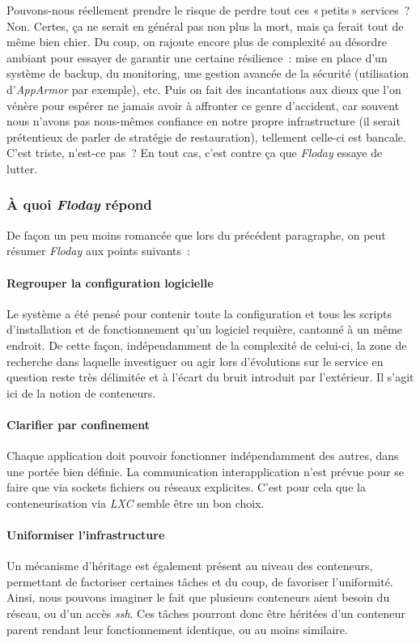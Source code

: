 Pouvons-nous réellement prendre le risque de perdre tout ces «\,petits\,» services~?
Non. Certes, ça ne serait en général pas non plus la mort, mais ça ferait tout de même bien chier.
Du coup, on rajoute encore plus de complexité au désordre ambiant pour essayer de garantir une certaine résilience~: mise en place d'un système de backup, du monitoring, une gestion avancée de la sécurité (utilisation d'\emph{AppArmor} par exemple), etc.
Puis on fait des incantations aux dieux que l'on vénère pour espérer ne jamais avoir à affronter ce genre d'accident, car souvent nous n'avons pas nous-mêmes confiance en notre propre infrastructure (il serait prétentieux de parler de stratégie de restauration), tellement celle-ci est bancale.
C'est triste, n'est-ce pas~? En tout cas, c'est contre ça que \emph{Floday} essaye de lutter.

\subsubsection{À quoi \emph{Floday} répond}
De façon un peu moins romancée que lors du précédent paragraphe, on peut résumer \emph{Floday} aux points suivants~:

\paragraph{Regrouper la configuration logicielle}
Le système a été pensé pour contenir toute la configuration et tous les scripts d'installation et de fonctionnement qu'un logiciel requière, cantonné à un même endroit.
De cette façon, indépendamment de la complexité de celui-ci, la zone de recherche dans laquelle investiguer ou agir lors d'évolutions sur le service en question reste très délimitée et à l'écart du bruit introduit par l'extérieur.
Il s'agit ici de la notion de \glspl{conteneur}.

\paragraph{Clarifier par confinement}
Chaque \gls{application} doit pouvoir fonctionner indépendamment des autres, dans une portée bien définie.
La communication interapplication n'est prévue pour se faire que via sockets fichiers ou réseaux explicites.
C'est pour cela que la conteneurisation via \emph{LXC} semble être un bon choix.

\paragraph{Uniformiser l'infrastructure}
Un mécanisme d'héritage est également présent au niveau des \glspl{conteneur}, permettant de factoriser certaines tâches et du coup, de favoriser l'uniformité.
Ainsi, nous pouvons imaginer le fait que plusieurs conteneurs aient besoin du réseau, ou d'un accès \emph{ssh}.
Ces tâches pourront donc être héritées d'un conteneur parent rendant leur fonctionnement identique, ou au moins similaire.

